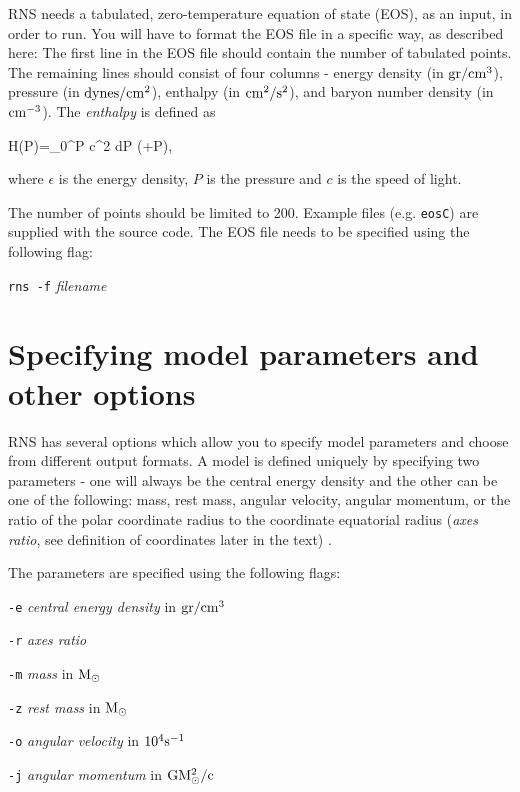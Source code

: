 RNS needs a tabulated, zero-temperature equation of state (EOS), as an input, 
in order to run. 
You will have to format the EOS file in a specific way, as described here: 
The first line in the EOS file should contain the number of tabulated points. 
The remaining lines should consist of four columns - energy 
density (in ${\rm gr/cm^3}$), pressure (in ${\rm dynes/cm^2}$), enthalpy (in
${\rm cm^2/s^2}$), and baryon number density (in ${\rm cm^{-3}}$). The 
{\it enthalpy} is defined as

\bee H(P)=\int_0^P { c^2 dP \over (\epsilon +P)}, \ee

\<where $\epsilon$ is the energy density, $P$ is the pressure and $c$ is the
speed of light.

The number of points should be limited to 200. Example files 
(e.g. {\tt eosC}) are supplied with the source code. The EOS file needs to be 
specified
using the following flag:

\vspace{0.3cm}

{\tt rns -f} {\it filename}



\section{Specifying model parameters and other options}

RNS has several options which allow you to specify model parameters and choose 
from different output formats. A model is defined uniquely by specifying two
parameters - one will always be the central energy density and the other
can be one of the following: mass, rest mass, angular velocity, 
angular momentum, or the ratio of the polar coordinate radius to the 
coordinate equatorial radius ({\it axes ratio}, see definition of coordinates 
later in the text) .

\vspace{0.3cm}
  
\<The parameters are specified using the following flags:
 
\begin{description}

\item{\tt -e} {\it central energy density} in ${\rm gr/cm^3}$

\item{\tt -r} {\it axes ratio}

\item{\tt -m} {\it mass} in ${\rm M}_{\odot}$

\item{\tt -z} {\it rest mass} in ${\rm M_{\odot}}$

\item{\tt -o} {\it angular velocity} in ${\rm 10^4 s^{-1}}$

\item{\tt -j} {\it angular momentum} in ${\rm GM_{\odot}^2/c}$
 
\end{description}


